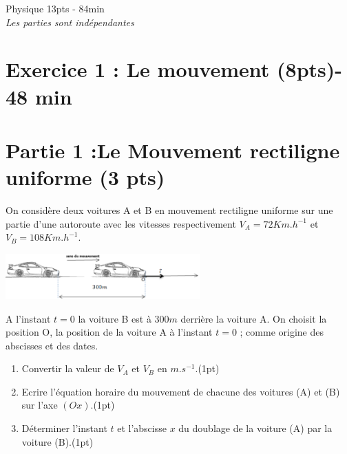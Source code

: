 \documentclass[12pt]{article}
\begin{document}
\begin{center}
\hrulefill
\Large{Physique 13pts - 84min}
\hrulefill\\
    \emph{Les  parties sont indépendantes}
\end{center}
\section*{Exercice 1 : Le mouvement \dotfill(8pts)- 48 min }
\vspace{-0.5cm}
 \section*{Partie 1 :Le Mouvement rectiligne uniforme \dotfill(3 pts)}
 On considère deux voitures A et B en mouvement rectiligne uniforme sur une partie d’une autoroute avec les vitesses respectivement $V_A=72Km.h^{-1}$ et $V_B=108Km.h^{-1}$.
	\vspace{-0.4cm}
 \begin{center}
	\includegraphics[width=0.56\textwidth]{./img/ex1.png}
\end{center}


	\vspace{-0.4cm}
A l’instant $t=0$ la voiture B est à $300m$ derrière la voiture A.
On choisit la position O, la position de la voiture A à l’instant $t=0$ ; comme origine des abscisses et des dates.

\begin{enumerate}
	\item  Convertir la valeur de $V_A$ et $V_B$ en $m.s^{-1}$.\dotfill(1pt)
	\item Ecrire l’équation horaire du mouvement de chacune des voitures (A) et (B) sur l’axe $(Ox)$.\dotfill(1pt)
	\item  Déterminer l’instant $t$ et l’abscisse $x$ du doublage de la voiture (A) par la voiture (B).\dotfill(1pt)
\end{enumerate}
\end{document}
